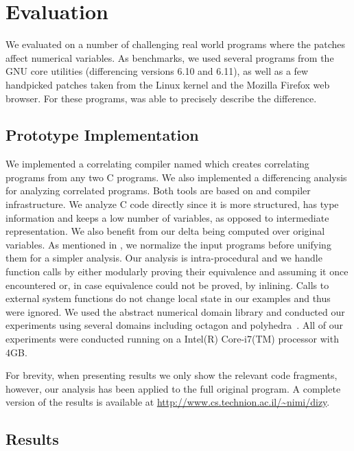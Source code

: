 \section{Evaluation}
We evaluated {\tool} on a number of challenging real world programs where the patches affect numerical variables. As benchmarks, we used several programs from the GNU core utilities (differencing versions 6.10 and 6.11), as well as a few handpicked patches taken from the Linux kernel and the Mozilla Firefox web browser. For these programs, {\tool} was able to precisely describe the difference.

\subsection{Prototype Implementation}
We implemented a correlating compiler named  which creates correlating programs from any two C programs. We also implemented a differencing analysis for analyzing correlated programs. Both tools are based on  and  compiler infrastructure. We analyze C code directly since it is more structured, has type information and keeps a low number of variables, as opposed to intermediate representation. We also benefit from our delta being computed over original variables. As mentioned in , we normalize the input programs before unifying them for a simpler analysis. Our analysis is intra-procedural and we handle function calls by either modularly proving their equivalence and assuming it once encountered or, in case equivalence could not be proved, by inlining. Calls to external system functions do not change local state in our examples and thus were ignored. We used the  abstract numerical domain library and conducted our experiments using several domains including octagon \cite{Mine2006} and polyhedra~\cite{CousotHalbwachs78}. All of our experiments were conducted running on a Intel(R) Core-i7(TM) processor with 4GB.

For brevity, when presenting results we only show the relevant code fragments, however, our analysis has been applied to the full original program. A complete version of the results is available at {\footnotesize \url{http://www.cs.technion.ac.il/~nimi/dizy}}.



\subsection{Results}

